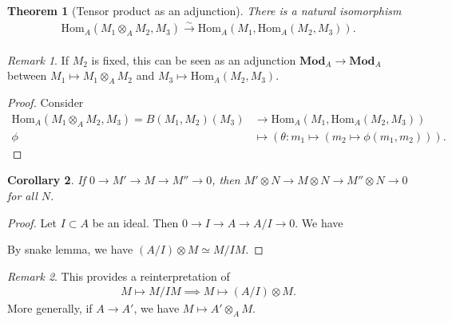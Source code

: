 \documentclass[12pt]{report}
\theoremstyle{plain}
\newtheorem{theorem}{Theorem}[section]
\newtheorem{corollary}[theorem]{Corollary}
\theoremstyle{remark}
\newtheorem*{remark}{Remark}
\theoremstyle{definition}
\newcommand{\Hom}[3]{\mathrm{Hom}_{#3}(#1,#2)}
\begin{document}
\begin{theorem}[Tensor product as an adjunction]
    There is a natural isomorphism
    \begin{align*}
        \Hom{M_1\otimes_A M_2}{M_3}{A}\xrightarrow[]{\sim} \Hom{M_1}{\Hom{M_2}{M_3}{A}}{A}.
    \end{align*}
\end{theorem}
\begin{remark}
    If $M_2$ is fixed, this can be seen as an adjunction $\mathbf{Mod}_A\to \mathbf{Mod}_A$ between $M_1\mapsto M_1\otimes_A M_2$ and $M_3\mapsto \Hom{M_2}{M_3}{A}$.
\end{remark}
\begin{proof}
    Consider
    \begin{align*}
        \Hom{M_1\otimes_A M_2}{M_3}{A} = B(M_1,M_2)(M_3) &\to \Hom{M_1}{\Hom{M_2}{M_3}{A}}{A} \\
        \phi &\mapsto (\theta:m_1\mapsto (m_2\mapsto \phi(m_1,m_2))).
    \end{align*}
\end{proof}

\begin{corollary}
    If $0\to M'\to M\to M''\to 0$, then $M'\otimes N\to M\otimes N\to M''\otimes N\to 0$ for all $N$.
\end{corollary}
\begin{proof}
    Let $I\subset A$ be an ideal. Then $0\to I\to A\to A/I\to 0$. We have
    \begin{figure}[H]
        \centering
    \end{figure}
    \noindent By snake lemma, we have $(A/I)\otimes M\simeq M/IM$.
\end{proof}
\begin{remark}
    This provides a reinterpretation of
    \begin{align*}
        M\mapsto M/IM \implies M\mapsto (A/I)\otimes M.
    \end{align*}
    More generally, if $A\to A'$, we have $M\mapsto A'\otimes_A M$.
\end{remark}
\end{document}
